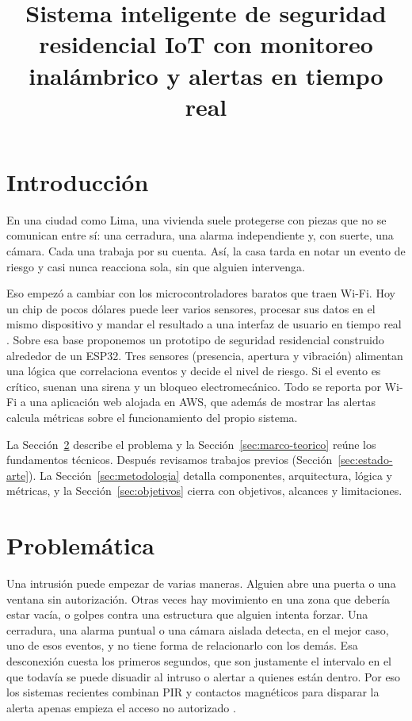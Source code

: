 \documentclass[conference]{IEEEtran}
\title{Sistema inteligente de seguridad residencial IoT con monitoreo inalámbrico y alertas en tiempo real}
\author{
  \IEEEauthorblockN{Ariann Abigail Salcedo Quiroz\\
    Diego Randolp Quispe Apaza\\
    Federico Iribar Casanova\\
    Sofia del Pilar Salazar Mendoza}
  \IEEEauthorblockA{Universidad de Ingeniería y Tecnología\\
    Internet de las Cosas\\
    22 de setiembre de 2026}
}
\begin{document}
\maketitle

\section{Introducción}
\label{sec:introduccion}

En una ciudad como Lima, una vivienda suele protegerse con piezas que no se comunican entre sí: una cerradura, una alarma independiente y, con suerte, una cámara. Cada una trabaja por su cuenta. Así, la casa tarda en notar un evento de riesgo y casi nunca reacciona sola, sin que alguien intervenga.

Eso empezó a cambiar con los microcontroladores baratos que traen Wi-Fi. Hoy un chip de pocos dólares puede leer varios sensores, procesar sus datos en el mismo dispositivo y mandar el resultado a una interfaz de usuario en tiempo real \cite{alfuqaha2015survey, oktafiani2025esp32}. Sobre esa base proponemos un prototipo de seguridad residencial construido alrededor de un ESP32. Tres sensores (presencia, apertura y vibración) alimentan una lógica que correlaciona eventos y decide el nivel de riesgo. Si el evento es crítico, suenan una sirena y un bloqueo electromecánico. Todo se reporta por Wi-Fi a una aplicación web alojada en AWS, que además de mostrar las alertas calcula métricas sobre el funcionamiento del propio sistema.

La Sección~\ref{sec:problematica} describe el problema y la Sección~\ref{sec:marco-teorico} reúne los fundamentos técnicos. Después revisamos trabajos previos (Sección~\ref{sec:estado-arte}). La Sección~\ref{sec:metodologia} detalla componentes, arquitectura, lógica y métricas, y la Sección~\ref{sec:objetivos} cierra con objetivos, alcances y limitaciones.

\section{Problemática}
\label{sec:problematica}

Una intrusión puede empezar de varias maneras. Alguien abre una puerta o una ventana sin autorización. Otras veces hay movimiento en una zona que debería estar vacía, o golpes contra una estructura que alguien intenta forzar. Una cerradura, una alarma puntual o una cámara aislada detecta, en el mejor caso, uno de esos eventos, y no tiene forma de relacionarlo con los demás. Esa desconexión cuesta los primeros segundos, que son justamente el intervalo en el que todavía se puede disuadir al intruso o alertar a quienes están dentro. Por eso los sistemas recientes combinan PIR y contactos magnéticos para disparar la alerta apenas empieza el acceso no autorizado \cite{arinde2024multisensor}.
\end{document}
